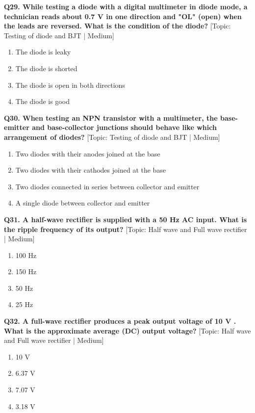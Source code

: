 \noindent\textbf{Q29. While testing a diode with a digital multimeter in diode mode, a technician reads about 0.7 V in one direction and "OL" (open) when the leads are reversed. What is the condition of the diode?} \hfill [Topic: Testing of diode and BJT | Medium]
\begin{enumerate}[label=(\alph*),topsep=2pt,itemsep=1pt,partopsep=0pt,parsep=0pt]
    \item {The diode is leaky}
    \item {The diode is shorted}
    \item {The diode is open in both directions}
    \item {The diode is good}
\end{enumerate}
\vspace{2mm}

\noindent\textbf{Q30. When testing an NPN transistor with a multimeter, the base-emitter and base-collector junctions should behave like which arrangement of diodes?} \hfill [Topic: Testing of diode and BJT | Medium]
\begin{enumerate}[label=(\alph*),topsep=2pt,itemsep=1pt,partopsep=0pt,parsep=0pt]
    \item {Two diodes with their anodes joined at the base}
    \item {Two diodes with their cathodes joined at the base}
    \item {Two diodes connected in series between collector and emitter}
    \item {A single diode between collector and emitter}
\end{enumerate}
\vspace{2mm}

\noindent\textbf{Q31. A half-wave rectifier is supplied with a 50 Hz AC input. What is the ripple frequency of its output?} \hfill [Topic: Half wave and Full wave rectifier | Medium]
\begin{enumerate}[label=(\alph*),topsep=2pt,itemsep=1pt,partopsep=0pt,parsep=0pt]
    \item {100 Hz}
    \item {150 Hz}
    \item {50 Hz}
    \item {25 Hz}
\end{enumerate}
\vspace{2mm}

\noindent\textbf{Q32. A full-wave rectifier produces a peak output voltage of 10 V . What is the approximate average (DC) output voltage?} \hfill [Topic: Half wave and Full wave rectifier | Medium]
\begin{enumerate}[label=(\alph*),topsep=2pt,itemsep=1pt,partopsep=0pt,parsep=0pt]
    \item {10 V}
    \item {6.37 V}
    \item {7.07 V}
    \item {3.18 V}
\end{enumerate}
\vspace{2mm}

